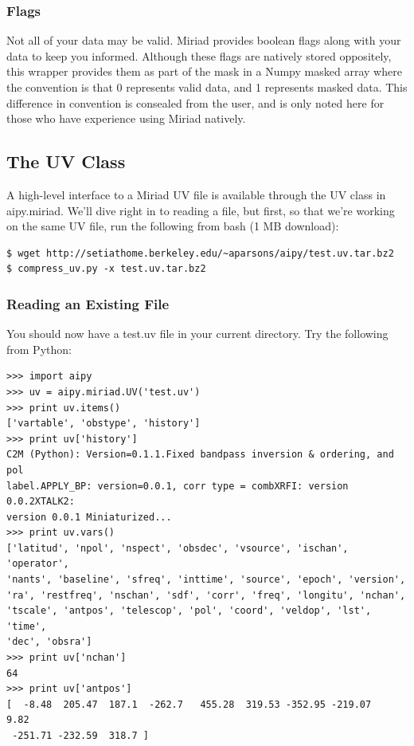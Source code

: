 \subsubsection{Flags}
Not all of your data may be valid.  Miriad provides boolean flags along with 
your data to keep you informed.  Although these flags are natively stored
oppositely, this wrapper provides them as part of the mask in a Numpy masked
array where the convention is that 0 represents valid data, and 1 represents
masked data.  This difference in convention is consealed from the user,
and is only noted here for those who have experience using Miriad natively.

\subsection{The UV Class}

A high-level interface to a Miriad UV file is available through the 
UV class in aipy.miriad.  We'll dive right in to reading a file, but first,
so that we're working on the same UV file, run the following from bash (1 MB
download):

\begin{verbatim}
$ wget http://setiathome.berkeley.edu/~aparsons/aipy/test.uv.tar.bz2
$ compress_uv.py -x test.uv.tar.bz2
\end{verbatim}

\subsubsection{Reading an Existing File}

You should now have a test.uv file in your current directory.  Try the
following from Python:

\begin{verbatim}
>>> import aipy
>>> uv = aipy.miriad.UV('test.uv')
>>> print uv.items()
['vartable', 'obstype', 'history']
>>> print uv['history']
C2M (Python): Version=0.1.1.Fixed bandpass inversion & ordering, and pol 
label.APPLY_BP: version=0.0.1, corr type = combXRFI: version 0.0.2XTALK2: 
version 0.0.1 Miniaturized...
>>> print uv.vars()
['latitud', 'npol', 'nspect', 'obsdec', 'vsource', 'ischan', 'operator', 
'nants', 'baseline', 'sfreq', 'inttime', 'source', 'epoch', 'version', 
'ra', 'restfreq', 'nschan', 'sdf', 'corr', 'freq', 'longitu', 'nchan', 
'tscale', 'antpos', 'telescop', 'pol', 'coord', 'veldop', 'lst', 'time', 
'dec', 'obsra']
>>> print uv['nchan']
64
>>> print uv['antpos']
[  -8.48  205.47  187.1  -262.7   455.28  319.53 -352.95 -219.07    9.82
 -251.71 -232.59  318.7 ]
\end{verbatim}

